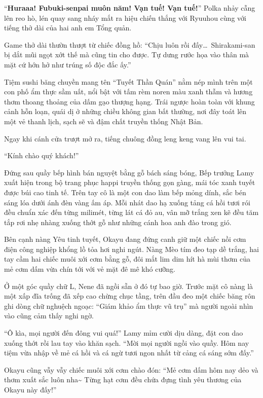 \documentclass[../main.tex]{subfiles}
\begin{document}
``\textbf{Huraaa! Fubuki-senpai muôn năm! Vạn tuế! Vạn tuế!}'' Polka nhảy cẫng lên reo hò, lén quay sang nháy mắt ra hiệu chiến thắng với Ryuuhou cùng với tiếng thở dài của hai anh em Tổng quản.

Game thở dài thườn thượt từ chiếc đồng hồ: ``Chịu luôn rồi đấy\dots\ Shirakami-san bị dắt mũi ngọt xớt thế mà cũng tin cho được. Tự dưng rước họa vào thân mà mặt cứ hớn hở như trúng số độc đắc ấy.''

\ct

Tiệm sushi băng chuyền mang tên ``Tuyết Thần Quán'' nằm nép mình trên một con phố ẩm thực sầm uất, nổi bật với tấm rèm noren màu xanh thẫm và hương thơm thoang thoảng của dấm gạo thượng hạng. Trái ngược hoàn toàn với khung cảnh hỗn loạn, quái dị ở những chiều không gian bất thường, nơi đây toát lên một vẻ thanh lịch, sạch sẽ và đậm chất truyền thống Nhật Bản.

Ngay khi cánh cửa trượt mở ra, tiếng chuông đồng leng keng vang lên vui tai.

``Kính chào quý khách!''

Đứng sau quầy bếp hình bán nguyệt bằng gỗ bách sáng bóng, Bếp trưởng Lamy xuất hiện trong bộ trang phục happi truyền thống gọn gàng, mái tóc xanh tuyết được búi cao tinh tế. Trên tay cô là một con dao làm bếp mỏng dính, sắc bén sáng lóa dưới ánh đèn vàng ấm áp. Mỗi nhát dao hạ xuống tảng cá hồi tươi rói đều chuẩn xác đến từng milimét, từng lát cá đỏ au, vân mỡ trắng xen kẽ đều tăm tắp rơi nhẹ nhàng xuống thớt gỗ như những cánh hoa anh đào trong gió.

Bên cạnh nàng Yêu tinh tuyết, Okayu đang đứng canh giữ một chiếc nồi cơm điện công nghiệp khổng lồ tỏa hơi nghi ngút. Nàng Mèo tím đeo tạp dề trắng, hai tay cầm hai chiếc muôi xới cơm bằng gỗ, đôi mắt lim dim hít hà mùi thơm của mẻ cơm dấm vừa chín tới với vẻ mặt đê mê khó cưỡng.

Ở một góc quầy chữ L, Nene đã ngồi sẵn ở đó tự bao giờ. Trước mặt cô nàng là một xấp đĩa trống đã xếp cao chừng chục tầng, trên đầu đeo một chiếc băng rôn ghi dòng chữ nghuệch ngoạc: ``Giám khảo ẩm thực vũ trụ'' mà người ngoài nhìn vào cũng cảm thấy nghi ngờ.

``Ô kìa, mọi người đến đông vui quá!'' Lamy mỉm cười dịu dàng, đặt con dao xuống thớt rồi lau tay vào khăn sạch. ``Mời mọi người ngồi vào quầy. Hôm nay tiệm vừa nhập về mẻ cá hồi và cá ngừ tươi ngon nhất từ cảng cá sáng sớm đấy.''

Okayu cũng vẫy vẫy chiếc muôi xới cơm chào đón: ``Mẻ cơm dấm hôm nay dẻo và thơm xuất sắc luôn nha\~{} Từng hạt cơm đều chứa đựng tình yêu thương của Okayu này đấy!''
\end{document}
